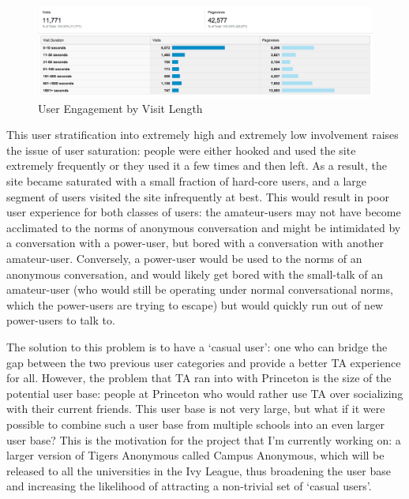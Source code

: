 \begin{figure}[H]
\centering
\includegraphics[trim= 0mm 0mm 0mm 0mm, clip, scale=0.3]{./Figures/UserStratificationVisitLength}
\caption{User Engagement by Visit Length}
\label{fig:UserStratificationVisitLength}
\end{figure}

This user stratification into extremely high and extremely low involvement raises the issue of user saturation: people were either hooked and used the site extremely frequently or they used it a few times and then left. As a result, the site became saturated with a small fraction of hard-core users, and a large segment of users visited the site infrequently at best. This would result in poor user experience for both classes of users: the amateur-users may not have become acclimated to the norms of anonymous conversation and might be intimidated by a conversation with a power-user, but bored with a conversation with another amateur-user. Conversely, a power-user would be used to the norms of an anonymous conversation, and would likely get bored with the small-talk of an amateur-user (who would still be operating under normal conversational norms, which the power-users are trying to escape) but would quickly run out of new power-users to talk to.

The solution to this problem is to have a `casual user': one who can bridge the gap between the two previous user categories and provide a better TA experience for all. However, the problem that TA ran into with Princeton is the size of the potential user base: people at Princeton who would rather use TA over socializing with their current friends. This user base is not very large, but what if it were possible to combine such a user base from multiple schools into an even larger user base? This is the motivation for the project that I'm currently working on: a larger version of Tigers Anonymous called Campus Anonymous, which will be released to all the universities in the Ivy League, thus broadening the user base and increasing the likelihood of attracting a non-trivial set of `casual users'.
